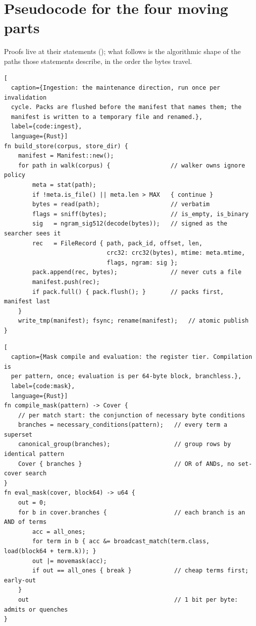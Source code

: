 \documentclass[11pt,letterpaper]{article}
\begin{document}
\appendix
\section{Pseudocode for the four moving parts}
\label{app:pseudocode}
Proofs live at their statements ();
what follows is the algorithmic shape of the paths those statements
describe, in the order the bytes travel.

\begin{lstlisting}[
  caption={Ingestion: the maintenance direction, run once per invalidation
  cycle. Packs are flushed before the manifest that names them; the
  manifest is written to a temporary file and renamed.},
  label={code:ingest},
  language={Rust}]
fn build_store(corpus, store_dir) {
    manifest = Manifest::new();
    for path in walk(corpus) {                 // walker owns ignore policy
        meta = stat(path);
        if !meta.is_file() || meta.len > MAX   { continue }
        bytes = read(path);                    // verbatim
        flags = sniff(bytes);                  // is_empty, is_binary
        sig   = ngram_sig512(decode(bytes));   // signed as the searcher sees it
        rec   = FileRecord { path, pack_id, offset, len,
                             crc32: crc32(bytes), mtime: meta.mtime,
                             flags, ngram: sig };
        pack.append(rec, bytes);               // never cuts a file
        manifest.push(rec);
        if pack.full() { pack.flush(); }       // packs first, manifest last
    }
    write_tmp(manifest); fsync; rename(manifest);   // atomic publish
}
\end{lstlisting}

\begin{lstlisting}[
  caption={Mask compile and evaluation: the register tier. Compilation is
  per pattern, once; evaluation is per 64-byte block, branchless.},
  label={code:mask},
  language={Rust}]
fn compile_mask(pattern) -> Cover {
    // per match start: the conjunction of necessary byte conditions
    branches = necessary_conditions(pattern);   // every term a superset
    canonical_group(branches);                  // group rows by identical pattern
    Cover { branches }                          // OR of ANDs, no set-cover search
}
fn eval_mask(cover, block64) -> u64 {
    out = 0;
    for b in cover.branches {                   // each branch is an AND of terms
        acc = all_ones;
        for term in b { acc &= broadcast_match(term.class, load(block64 + term.k)); }
        out |= movemask(acc);
        if out == all_ones { break }            // cheap terms first; early-out
    }
    out                                         // 1 bit per byte: admits or quenches
}
\end{lstlisting}
\end{document}
